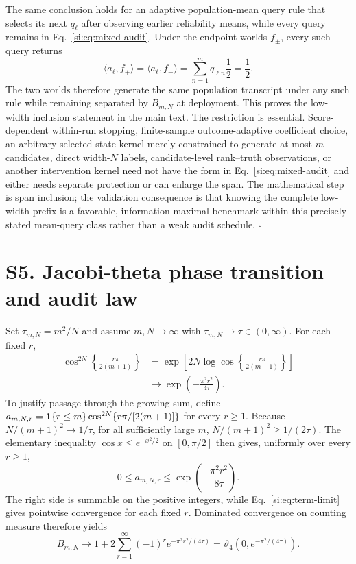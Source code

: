 \documentclass[10pt,twocolumn]{article}
\begin{document}
The same conclusion holds for an adaptive population-mean query rule that selects its next $q_\ell$ after observing earlier reliability means, while every query remains in Eq.~\ref{si:eq:mixed-audit}. Under the endpoint worlds $f_\pm$, every such query returns
\begin{equation}
\langle a_\ell,f_+\rangle
=\langle a_\ell,f_-\rangle
=\sum_{n=1}^m q_{\ell n}\frac12
=\frac12.
\label{si:eq:sequential-transcript}
\end{equation}
The two worlds therefore generate the same population transcript under any such rule while remaining separated by $B_{m,N}$ at deployment. This proves the low-width inclusion statement in the main text. The restriction is essential. Score-dependent within-run stopping, finite-sample outcome-adaptive coefficient choice, an arbitrary selected-state kernel merely constrained to generate at most $m$ candidates, direct width-$N$ labels, candidate-level rank--truth observations, or another intervention kernel need not have the form in Eq.~\ref{si:eq:mixed-audit} and either needs separate protection or can enlarge the span. The mathematical step is span inclusion; the validation consequence is that knowing the complete low-width prefix is a favorable, information-maximal benchmark within this precisely stated mean-query class rather than a weak audit schedule. \hfill$\square$

\section*{S5. Jacobi-theta phase transition and audit law}

Set $\tau_{m,N}=m^2/N$ and assume $m,N\to\infty$ with $\tau_{m,N}\to\tau\in(0,\infty)$. For each fixed $r$,
\begin{align}
\cos^{2N}\!\left\{\frac{r\pi}{2(m+1)}\right\}
&=\exp\left[2N\log\cos\left\{\frac{r\pi}{2(m+1)}\right\}\right]\nonumber\\
&\longrightarrow \exp\left(-\frac{\pi^2r^2}{4\tau}\right).
\label{si:eq:term-limit}
\end{align}
To justify passage through the growing sum, define
$a_{m,N,r}=\mathbf 1\{r\le m\}\cos^{2N}\{r\pi/[2(m+1)]\}$ for every
$r\ge1$. Because $N/(m+1)^2\to1/\tau$, for all sufficiently large $m$,
$N/(m+1)^2\ge1/(2\tau)$. The elementary inequality
$\cos x\le e^{-x^2/2}$ on $[0,\pi/2]$ then gives, uniformly over every
$r\ge1$,
\begin{equation}
0\le a_{m,N,r}
\le \exp\left(-\frac{\pi^2r^2}{8\tau}\right).
\label{si:eq:theta-envelope}
\end{equation}
The right side is summable on the positive integers, while
Eq.~\ref{si:eq:term-limit} gives pointwise convergence for each fixed $r$.
Dominated convergence on counting measure therefore yields
\begin{equation}
B_{m,N}\longrightarrow
1+2\sum_{r=1}^\infty(-1)^r
e^{-\pi^2r^2/(4\tau)}
=\vartheta_4\!\left(0,e^{-\pi^2/(4\tau)}\right).
\label{si:eq:theta4}
\end{equation}
\end{document}
